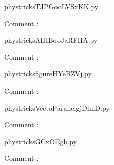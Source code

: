     \clearpage
    


    \newcommand{\CaptionFigTJPGooLVSxKK}{<+Type your caption here+>}
    \begin{center}
        
    \end{center}
    phystricksTJPGooLVSxKK.py

    Comment : 

    \clearpage
    


    \newcommand{\CaptionFigAIHBooJaRFHA}{<+Type your caption here+>}
    \begin{center}
        
    \end{center}
    phystricksAIHBooJaRFHA.py

    Comment : 

    \clearpage
    


    \newcommand{\CaptionFigfigureHYeBZVj}{<+Type your caption here+>}
    \begin{center}
        
    \end{center}
    phystricksfigureHYeBZVj.py

    Comment : 

    \clearpage
    


    \newcommand{\CaptionFigVectoParallelgjDlmD}{<+Type your caption here+>}
    \begin{center}
        
    \end{center}
    phystricksVectoParallelgjDlmD.py

    Comment : 

    \clearpage
    


    \newcommand{\CaptionFigGCxOEgb}{<+Type your caption here+>}
    \begin{center}
        
    \end{center}
    phystricksGCxOEgb.py

    Comment : 

    \clearpage
    


